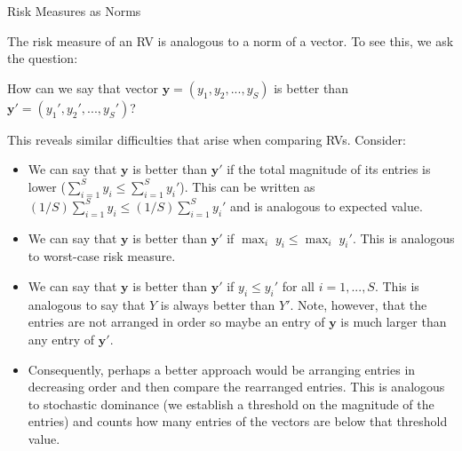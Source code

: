 \documentclass[handout,9pt]{beamer}
\begin{document}
%
\begin{frame}{Risk Measures as Norms}

The risk measure of an RV is analogous to a norm of a vector. To see this, we ask the question:
\begin{block}{}
How can we say that vector $\mathbf{y}=(y_1,y_2,...,y_S)$ is better than $\mathbf{y}'=(y_1',y_2',...,y_S')$?
\end{block}
This reveals similar difficulties that arise when comparing RVs. Consider:
\begin{itemize}

\item We can say that $\mathbf{y} $ is better than $\mathbf{y}'$ if the total magnitude of its entries is lower ($\sum_{i=1}^Sy_i\leq \sum_{i=1}^Sy_i'$). This can be written as $(1/S)\sum_{i=1}^Sy_i\leq (1/S)\sum_{i=1}^Sy_i'$  and is analogous to expected value.

\item We can say that $\mathbf{y} $ is better than $\mathbf{y}'$ if $\max_i\; y_i\leq \max_i\; y_i'$. This is analogous to worst-case risk measure. 

\item  We can  say that $\mathbf{y}$ is better than $\mathbf{y}'$ if $y_i\leq y_i'$ for all $i=1,...,S$. This is analogous to say that $Y$ is always better than $Y'$.  Note, however, that the entries are not arranged in order so maybe an entry of $\mathbf{y}$ is much larger than any entry of $\mathbf{y}'$.  

\item Consequently, perhaps a better approach would be arranging entries in decreasing order and then compare the rearranged entries.  This is analogous to stochastic dominance (we establish a threshold on the magnitude of the entries) and counts how many entries of the vectors are below that threshold value.  

\end{itemize}



\end{frame}
\end{document}
